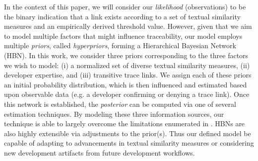 In the context of this paper, we will consider our \textit{likelihood} (observations) to be the binary indication that a link exists according to a set of textual similarity measures and an empirically derived threshold value. However, given that we aim to model multiple factors that might influence traceability, our model employs multiple \textit{priors}, called \textit{hyperpriors}, forming a Hierarchical Bayesian Network (HBN). In this work, we consider three priors corresponding to the three factors we wish to model: (i) a normalized set of diverse textual similarity measures, (ii) developer expertise, and (iii) transitive trace links. We assign each of these priors an initial probability distribution, which is then influenced and estimated based upon observable data (e.g. a developer confirming or denying a trace link). Once this network is established, the \textit{posterior} can be computed via one of several estimation techniques. By modeling these three information sources, our technique is able to largely overcome the limitations enumerated in . HBNs are also highly extensible via adjustments to the prior(s). Thus our defined model be capable of adapting to advancements in textual similarity measures or considering new development artifacts from future development workflows.
